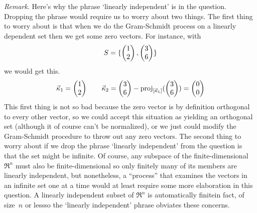 \begin{exercises}
\begin{answer}
       \textit{Remark}.
       Here's why the phrase `linearly independent' is in the question.
       Dropping the phrase would require us to worry about two things.
       The first thing to worry about is that
       when we do the Gram-Schmidt process on a linearly dependent 
       set then we get some zero vectors.
       For instance, with
       \begin{equation*}
         S=\set{\colvec{1 \\ 2},\colvec{3 \\ 6}}
       \end{equation*}
       we would get this.
       \begin{equation*}
         \vec{\kappa}_1   =   \colvec{1 \\ 2}
         \qquad 
         \vec{\kappa}_2
           =
           \colvec{3 \\ 6}-\proj{\colvec{3 \\ 6}}{\spanof{\vec{\kappa}_1}} 
           =
           \colvec{0 \\ 0}
       \end{equation*}
       This first thing is not so bad because
       the zero vector is by definition orthogonal to every other vector,
       so we could accept this situation 
       as yielding an orthogonal set (although
       it of course can't be normalized), or we just could modify the
       Gram-Schmidt procedure to throw out any zero vectors.
       The second thing to worry about if we drop the phrase 
       `linearly independent' from the question is that the set might
       be infinite.
       Of course, any subspace of the finite-dimensional $\Re^n$
       must also be finite-dimensional so only finitely many of its
       members are linearly independent, but nonetheless,
       a ``process'' that examines the vectors in an infinite set one at a
       time would at least require some more elaboration in this question. 
       A linearly independent subset of $\Re^n$ is automatically
       finite\Dash in fact, of
       size~$n$ or less\Dash so the `linearly independent' 
       phrase obviates these concerns.
     \end{answer}

\end{exercises}

